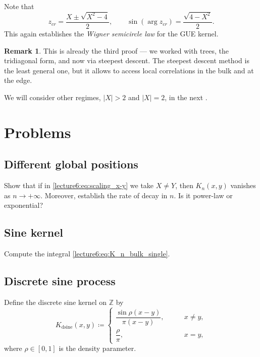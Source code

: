 \documentclass[letterpaper,11pt,oneside,reqno]{book}
\numberwithin{equation}{chapter}  %
\theoremstyle{definition}
\newtheorem{remark}[proposition]{Remark}
\begin{document}
Note that
\begin{equation*}
	z_{cr}=\frac{X\pm \sqrt{X^2-4}}{2},
	\qquad
	\sin(\arg z_{cr})=\frac{\sqrt{4-X^2}}{2}.
\end{equation*}
This again establishes the \emph{Wigner semicircle law} for the GUE kernel.

\begin{remark}
	This is already the third proof --- we worked with trees, the tridiagonal form,
	and now via steepest descent. The steepest descent method is the least general one,
	but it allows to access local correlations in the bulk and at the edge.
\end{remark}

We will consider other regimes, $|X|>2$ and $|X|=2$, in the next
.





\section{Problems}

\subsection{Different global positions}
\label{lecture6:prob:different-global-positions}

Show that if in \eqref{lecture6:eq:scaling_x-y} we take $X\ne Y$, then
$K_n(x,y)$ vanishes as $n\to+\infty$. Moreover,
establish the rate of decay in $n$. Is it power-law or exponential?

\subsection{Sine kernel}
\label{lecture6:prob:sine-kernel}

Compute the integral
\eqref{lecture6:eq:K_n_bulk_single}.


\subsection{Discrete sine process}
\label{lecture6:prob:discrete-sine-process}

Define the discrete sine kernel on $\mathbb{Z}$ by
\begin{equation*}
	K_{\mathrm{dsine}}(x,y)\coloneqq
	\begin{cases}
		\dfrac{\sin \rho(x-y)}{\pi (x-y)},&\qquad x\ne y,\\[10pt]
		\dfrac{\rho}{\pi},&\qquad x=y,
	\end{cases}
\end{equation*}
where $\rho\in[0,1]$ is the density parameter.
\end{document}
